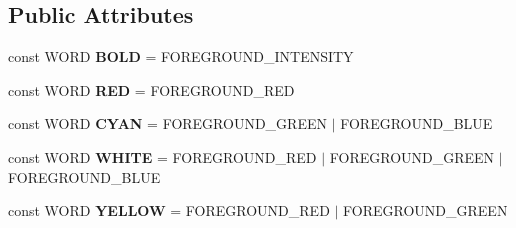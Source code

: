 \subsection*{Public Attributes}
\begin{DoxyCompactItemize}
\item 
const W\+O\+RD {\bfseries B\+O\+LD} = F\+O\+R\+E\+G\+R\+O\+U\+N\+D\+\_\+\+I\+N\+T\+E\+N\+S\+I\+TY\hypertarget{classspdlog_1_1sinks_1_1wincolor__sink_a888c3027bec45730a9be5d9c4612df5f}{}\label{classspdlog_1_1sinks_1_1wincolor__sink_a888c3027bec45730a9be5d9c4612df5f}

\item 
const W\+O\+RD {\bfseries R\+ED} = F\+O\+R\+E\+G\+R\+O\+U\+N\+D\+\_\+\+R\+ED\hypertarget{classspdlog_1_1sinks_1_1wincolor__sink_af936ba2a9707dcde3968c80231b41381}{}\label{classspdlog_1_1sinks_1_1wincolor__sink_af936ba2a9707dcde3968c80231b41381}

\item 
const W\+O\+RD {\bfseries C\+Y\+AN} = F\+O\+R\+E\+G\+R\+O\+U\+N\+D\+\_\+\+G\+R\+E\+EN $\vert$ F\+O\+R\+E\+G\+R\+O\+U\+N\+D\+\_\+\+B\+L\+UE\hypertarget{classspdlog_1_1sinks_1_1wincolor__sink_ac473468ff1bf16be1b790e2a5c90698b}{}\label{classspdlog_1_1sinks_1_1wincolor__sink_ac473468ff1bf16be1b790e2a5c90698b}

\item 
const W\+O\+RD {\bfseries W\+H\+I\+TE} = F\+O\+R\+E\+G\+R\+O\+U\+N\+D\+\_\+\+R\+ED $\vert$ F\+O\+R\+E\+G\+R\+O\+U\+N\+D\+\_\+\+G\+R\+E\+EN $\vert$ F\+O\+R\+E\+G\+R\+O\+U\+N\+D\+\_\+\+B\+L\+UE\hypertarget{classspdlog_1_1sinks_1_1wincolor__sink_ae12b15a4d57cd4c656e8b750c434e137}{}\label{classspdlog_1_1sinks_1_1wincolor__sink_ae12b15a4d57cd4c656e8b750c434e137}

\item 
const W\+O\+RD {\bfseries Y\+E\+L\+L\+OW} = F\+O\+R\+E\+G\+R\+O\+U\+N\+D\+\_\+\+R\+ED $\vert$ F\+O\+R\+E\+G\+R\+O\+U\+N\+D\+\_\+\+G\+R\+E\+EN\hypertarget{classspdlog_1_1sinks_1_1wincolor__sink_a09b5ee80272c35f36a8a7bd30e53ff49}{}\label{classspdlog_1_1sinks_1_1wincolor__sink_a09b5ee80272c35f36a8a7bd30e53ff49}

\end{DoxyCompactItemize}
